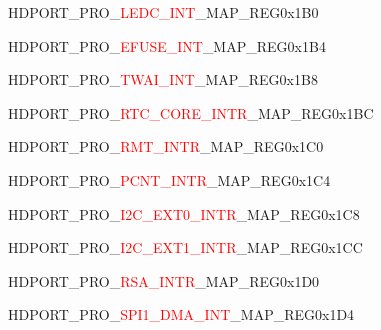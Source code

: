 \vspace{-3em}
\begin{register}{H}{DPORT\_PRO\_\textcolor{red}{LEDC\_INT}\_MAP\_REG}{0x1B0}\label{regdesc:PROLEDCINTMAPREG}
\end{register}
\vspace{-3em}
\begin{register}{H}{DPORT\_PRO\_\textcolor{red}{EFUSE\_INT}\_MAP\_REG}{0x1B4}\label{regdesc:PROEFUSEINTMAPREG}
\end{register}
\vspace{-3em}
\begin{register}{H}{DPORT\_PRO\_\textcolor{red}{TWAI\_INT}\_MAP\_REG}{0x1B8}\label{regdesc:PROCANINTMAPREG}
\end{register}
\vspace{-3em}
\begin{register}{H}{DPORT\_PRO\_\textcolor{red}{RTC\_CORE\_INTR}\_MAP\_REG}{0x1BC}\label{regdesc:PRORTCCOREINTRMAPREG}
\end{register}
\vspace{-3em}
\begin{register}{H}{DPORT\_PRO\_\textcolor{red}{RMT\_INTR}\_MAP\_REG}{0x1C0}\label{regdesc:PRORMTINTRMAPREG}
\end{register}
\vspace{-3em}
\begin{register}{H}{DPORT\_PRO\_\textcolor{red}{PCNT\_INTR}\_MAP\_REG}{0x1C4}\label{regdesc:PROPCNTINTRMAPREG}
\end{register}
\vspace{-3em}
\begin{register}{H}{DPORT\_PRO\_\textcolor{red}{I2C\_EXT0\_INTR}\_MAP\_REG}{0x1C8}\label{regdesc:PROI2CEXT0INTRMAPREG}
\end{register}
\vspace{-3em}
\begin{register}{H}{DPORT\_PRO\_\textcolor{red}{I2C\_EXT1\_INTR}\_MAP\_REG}{0x1CC}\label{regdesc:PROI2CEXT1INTRMAPREG}
\end{register}
\vspace{-3em}
\begin{register}{H}{DPORT\_PRO\_\textcolor{red}{RSA\_INTR}\_MAP\_REG}{0x1D0}\label{regdesc:PRORSAINTRMAPREG}
\end{register}
\vspace{-3em}
\begin{register}{H}{DPORT\_PRO\_\textcolor{red}{SPI1\_DMA\_INT}\_MAP\_REG}{0x1D4}\label{regdesc:PROSPI1DMAINTMAPREG}
\end{register}
